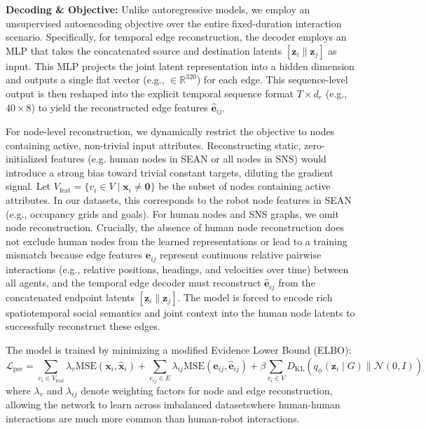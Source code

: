 \documentclass{article}
\providecommand{\DIFadd}[1]{{\protect\color{blue}\uwave{#1}}} %
\providecommand{\DIFaddbegin}{} %
\providecommand{\DIFaddend}{} %
\providecommand{\DIFaddincludegraphics}[2][]{{\color{blue}\fbox{\DIFOincludegraphics[#1]{#2}}}} %
\DeclareRobustCommand{\DIFaddbegin}{\DIFOaddbegin \let\includegraphics\DIFaddincludegraphics} %
\DeclareRobustCommand{\DIFaddend}{\DIFOaddend \let\includegraphics\DIFOincludegraphics} %
\begin{document}
\textbf{Decoding \& Objective:}
Unlike autoregressive models, we employ an unsupervised autoencoding objective over the entire fixed-duration interaction scenario.
Specifically, for temporal edge reconstruction, the decoder employs an MLP that takes the concatenated source and destination latents $[\mathbf{z}_i \| \mathbf{z}_j]$ as input. 
This MLP projects the joint latent representation into a hidden dimension and outputs a single flat vector (e.g., $\in \mathbb{R}^{320}$) for each edge. 
This sequence-level output is then reshaped into the explicit temporal sequence format $T \times d_e$ (e.g., $40 \times 8$) to yield the reconstructed edge features $\mathbf{\hat{e}}_{ij}$.

For node-level reconstruction, we dynamically restrict the objective to nodes containing active, non-trivial input attributes.
Reconstructing static, zero-initialized features (e.g. human nodes in SEAN or all nodes in SNS) would introduce a strong bias toward trivial constant targets, diluting the gradient signal.
Let $V_{\text{feat}} = \{ v_i \in V \mid \mathbf{x}_i \neq \mathbf{0} \}$ be the subset of nodes containing active attributes.
In our datasets, this corresponds to the robot node features in SEAN (e.g., occupancy grids and goals).
For human nodes and SNS graphs, we omit node reconstruction.
Crucially, the absence of human node reconstruction does not exclude human nodes from the learned representations or lead to a training mismatch because edge features $\mathbf{e}_{ij}$ represent continuous relative pairwise interactions (e.g., relative positions, headings, and velocities over time) between all agents, and the temporal edge decoder must reconstruct $\mathbf{\hat{e}}_{ij}$ from the concatenated endpoint latents $[\mathbf{z}_i \| \mathbf{z}_j]$.
The model is forced to encode rich spatiotemporal social semantics and joint context into the human node latents to successfully reconstruct these edges.

The model is trained by minimizing a modified Evidence Lower Bound (ELBO):
\begin{equation}
\label{eq:elbo}
\mathcal{L}_{\text{pre}} = \sum_{v_i \in V_{\text{feat}}} \lambda_{v} \text{MSE}(\mathbf{x}_i, \mathbf{\hat{x}}_i) + \sum_{e_{ij} \in E} \lambda_{ij} \text{MSE}(\mathbf{e}_{ij}, \mathbf{\hat{e}}_{ij}) + \beta \sum_{v_i \in V} D_{\text{KL}} \left( q_\phi(\mathbf{z}_i \mid G) \parallel \mathcal{N}(0, I) \right)
\end{equation}
where $\lambda_{v}$ and $\lambda_{ij}$ denote weighting factors for node and edge reconstruction, allowing the network to learn across imbalanced datasets\DIFaddbegin \DIFadd{, for example, }\DIFaddend where human-human interactions are much more common than human-robot interactions.
\end{document}
